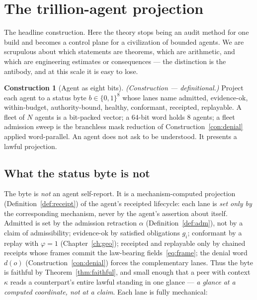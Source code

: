 \documentclass[11pt,oneside]{book}
\theoremstyle{definition}
\newtheorem{construction}{Construction}[chapter]
\theoremstyle{plain}
\theoremstyle{remark}
\newcommand{\adm}{\alpha}                      %
\newcommand{\CL}{\kappa}                       %
\newcommand{\Fitness}{\varphi}
\begin{document}
\section{The trillion-agent projection}

The headline construction. Here the theory stops being an audit method for one build and
becomes a control plane for a civilization of bounded agents. We are scrupulous about which
statements are theorems, which are arithmetic, and which are engineering estimates or
consequences --- the distinction is the antibody, and at this scale it is easy to lose.

\begin{construction}[Agent as eight bits]\label{con:agent8}
\emph{(Construction --- definitional.)} Project each agent to a status byte $b\in\{0,1\}^8$
whose lanes name \textsf{admitted}, \textsf{evidence-ok}, \textsf{within-budget},
\textsf{authority-bound}, \textsf{healthy}, \textsf{conformant}, \textsf{receipted},
\textsf{replayable}. A fleet of $N$ agents is a bit-packed vector; a $64$-bit word holds $8$
agents; a fleet admission sweep is the branchless mask reduction of
Construction~\ref{con:denial} applied word-parallel. An agent does not ask to be understood.
It presents a lawful projection.
\end{construction}

\subsection*{What the status byte is not}

The byte is \emph{not} an agent self-report. It is a mechanism-computed projection
(Definition~\ref{def:receipt}) of the agent's receipted lifecycle: each lane is \emph{set only
by} the corresponding mechanism, never by the agent's assertion about itself.
\textsf{Admitted} is set by the admission retraction $\adm$ (Definition~\ref{def:adm}), not by
a claim of admissibility; \textsf{evidence-ok} by satisfied obligations $g_i$;
\textsf{conformant} by a replay with $\Fitness=1$ (Chapter~\ref{ch:geo}); \textsf{receipted}
and \textsf{replayable} only by chained receipts whose frames commit the law-bearing
fields~\eqref{eq:frame}; the denial word $d(o)$ (Construction~\ref{con:denial}) forces the
complementary lanes. Thus the byte is faithful by Theorem~\ref{thm:faithful}, and small enough
that a peer with context $\CL$ reads a counterpart's entire lawful standing in one glance ---
\emph{a glance at a computed coordinate, not at a claim}. Each lane is fully mechanical:
\end{document}
